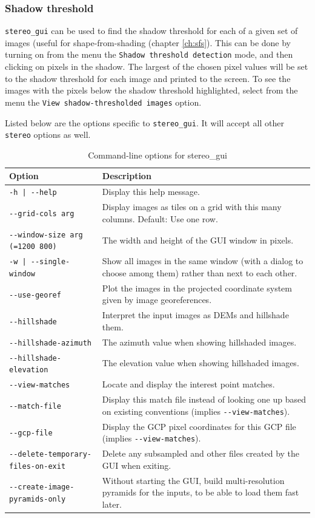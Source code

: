 \subsubsection{Shadow threshold}
\texttt{stereo\_gui} can be used to find the shadow threshold for each
of a given set of images (useful for shape-from-shading (chapter \ref{ch:sfs}).
This can be done by turning on from the menu
the \texttt{Shadow threshold detection} mode, and then clicking on
pixels in the shadow. The largest of the chosen pixel values will be set
to the shadow threshold for each image and printed to the screen. To see
the images with the pixels below the shadow threshold highlighted,
select from the menu the \texttt{View shadow-thresholded images} option.

\clearpage
Listed below are the options specific to \texttt{stereo\_gui}. It will accept
all other \texttt{stereo} options as well.

\begin{longtable}{|l|p{7.5cm}|}
\caption{Command-line options for stereo\_gui}
\label{tbl:stereogui}
\endfirsthead
\endhead
\endfoot
\endlastfoot
\hline
Option & Description \\ \hline \hline
\texttt{-h | -\/-help } & Display this help message.\\ \hline
\texttt{-\/-grid-cols arg} & Display images as tiles on a grid with this many columns. Default: Use one row.\\ \hline
\texttt{-\/-window-size arg (=1200 800)} & The width and height of the GUI window in pixels.\\ \hline
\texttt{-w | -\/-single-window } & Show all images in the same window (with a dialog to choose among them) rather than next to each other.\\ \hline
\texttt{-\/-use-georef} & Plot the images in the projected coordinate system given by image georeferences.\\ \hline
\texttt{-\/-hillshade} & Interpret the input images as DEMs and hillshade them.\\ \hline
\texttt{-\/-hillshade-azimuth} & The azimuth value when showing hillshaded images.\\ \hline
\texttt{-\/-hillshade-elevation} & The elevation value when showing hillshaded images.\\ \hline

\texttt{-\/-view-matches} & Locate and display the interest point matches.\\ \hline
\texttt{-\/-match-file} & Display this match file instead of looking one up based on existing conventions (implies \texttt{-\/-view-matches}). \\ \hline
\texttt{-\/-gcp-file} & Display the GCP pixel coordinates for this GCP file (implies \texttt{-\/-view-matches}). \\ \hline
\texttt{-\/-delete-temporary-files-on-exit} & Delete any subsampled and other files created by the GUI when exiting.\\ \hline
\texttt{-\/-create-image-pyramids-only} & Without starting the GUI, build multi-resolution pyramids for the inputs, to be able to load them fast later.\\ \hline
\end{longtable}


